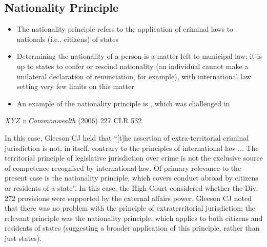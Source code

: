 \subsection{Nationality Principle}
\begin{itemize}
    \item The nationality principle refers to the application of criminal laws to nationals (i.e., citizens) of states
    \item Determining the nationality of a person is a matter left to municipal law; it is up to states to confer or rescind nationality (an individual cannot make a unilateral declaration of renunciation, for example), with international law setting very few limits on this matter
    \item An example of the nationality principle is , which was challenged in 
\end{itemize}
\begin{casedetails}{\textit{XYZ v Commonwealth} (2006) 227 CLR 532}
    
        \flushleft
        
        In this case, Gleeson CJ held that ``[t]he assertion of extra-territorial criminal jurisdiction is not, in itself, contrary to the principles of international law ... The territorial principle of legislative jurisdiction over crime is not the exclusive source of competence recognised by international law. Of primary relevance to the present case is the nationality principle, which covers conduct abroad by citizens or residents of a state''. In this case, the High Court considered whether the Div. 272 provisions were supported by the external affairs power. Gleeson CJ noted that there was no problem with the principle of extraterritorial jurisdiction; the relevant principle was the nationality principle, which applies to both citizens and residents of states (suggesting a broader application of this principle, rather than just states).
    \end{casedetails}


